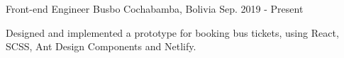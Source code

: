 \begin{cventries}
  \cventry
    {Front-end Engineer}
    {Busbo}
    {Cochabamba, Bolivia}
    {Sep. 2019 - Present}
    {
      \begin{cvitems}
         {Designed and implemented a prototype for booking bus tickets, using React, SCSS, Ant Design Components and Netlify.}
      \end{cvitems}
    }
\end{cventries}

